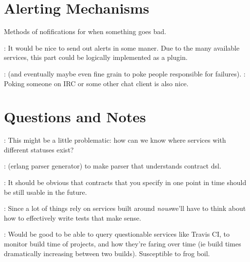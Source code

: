 \documentclass[12pt,twoside]{article}
\newcommand{\projectname}[0]{\textit{nous}}
\begin{document}
\section{Alerting Mechanisms}
Methods of nofifications for when something goes bad.
\begin{itemize}
  : It would be nice to send out
    alerts in some maner. Due to the many available services, this
    part could be logically implemented as a plugin.
  \begin{itemize}
    : (and eventually maybe even fine grain to
      poke people responsible for failures).
    : Poking someone on IRC or some
      other chat client is also nice.
  \end{itemize}
\end{itemize}

\section{Questions and Notes}
\begin{itemize}
  : This might be a little problematic: how can
    we know where services with different statuses exist?

  : (erlang parser generator) to make parser that
    understands contract dsl.

  : It should be obvious that
    contracts that you specify in one point in time should be still
    usable in the future.

  : Since a lot of things rely on services
    built around \projectname we'll have to think about how to
    effectively write tests that make sense.

  : Would be good to be able to query
    questionable services like Travis CI, to monitor build time of
    projects, and how they're faring over time (ie build times
    dramatically increasing between two builds). Susceptible to frog
    boil.

\end{itemize}
\end{document}
